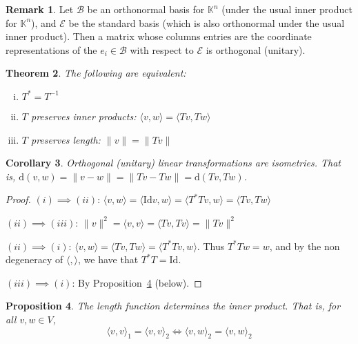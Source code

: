 \documentclass[10pt,fleqn]{article}
\newcommand{\met}{\mathrm{d}}
\newcommand{\id}{\mathrm{Id}}
\newcommand{\basis}{\mathcal{B}}
\newcommand{\varbasis}{\mathcal{E}}
\theoremstyle{definition} \newtheorem{defn}{Definition}[section]
\theoremstyle{plain}      \newtheorem{thm}[defn]{Theorem}
\theoremstyle{plain}      \newtheorem{prop}[defn]{Proposition}
\theoremstyle{plain}      \newtheorem{lem}[defn]{Lemma}
\theoremstyle{plain}      \newtheorem{cor}[defn]{Corollary}
\theoremstyle{plain}      \newtheorem{ad}[defn]{Addendum}
\theoremstyle{definition} \newtheorem{ex}[defn]{Example}
\theoremstyle{definition} \newtheorem{rem}[defn]{Remark}
\numberwithin{equation}{subsection}
\begin{document}
\begin{rem}
    Let $\basis$ be an orthonormal basis for $\mathbb{K}^n$ (under the usual inner product for $\mathbb{K}^n$), and $\varbasis$ be the standard basis (which is also orthonormal under the usual inner product).
    Then a matrix whose columns entries are the coordinate representations of the $e_i\in\basis$ with respect to $\varbasis$ is orthogonal (unitary).
\end{rem}

\begin{thm}
    The following are equivalent:
    \begin{enumerate}[(i)]
        \item $T^*=T^{-1}$
        \item $T$ preserves inner products: $\langle v,w\rangle=\langle Tv,Tw\rangle$
        \item $T$ preserves length: $\|v\|=\|Tv\|$
    \end{enumerate}
\end{thm}

\begin{cor}
    Orthogonal (unitary) linear transformations are isometries.
    That is, $\met(v,w)=\|v-w\|=\|Tv-Tw\|=\met(Tv,Tw)$.
\end{cor}

\begin{proof}
    \item[$(i)\implies(ii)$:]
    $\langle v,w\rangle=\langle \id v,w\rangle=\langle T^*Tv,w\rangle=\langle Tv,Tw\rangle$
    \item[$(ii)\implies(iii)$:]
    $\|v\|^2=\langle v,v\rangle=\langle Tv,Tv\rangle=\|Tv\|^2$
    \item[$(ii)\implies(i)$:]
    $\langle v,w\rangle=\langle Tv,Tw\rangle=\langle T^*Tv,w\rangle$.
    Thus $T^*Tw=w$, and by the non degeneracy of $\langle,\rangle$, we have that $T^*T=\id$.
    \item[$(iii)\implies(i)$:]
    By Proposition~\ref{inner-product-length} (below).
\end{proof}

\begin{prop}\label{inner-product-length}
    The length function determines the inner product.
    That is, for all $v,w\in V$,
    \[
        \langle v,v\rangle_1=\langle v,v\rangle_2\iff
        \langle v,w\rangle_2=\langle v,w\rangle_2
    \]
\end{prop}
\end{document}
